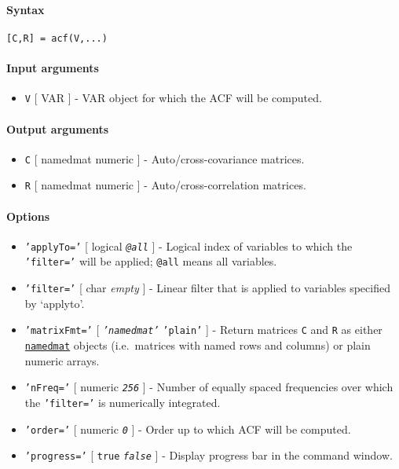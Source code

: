 


	\paragraph{Syntax}

\begin{verbatim}
[C,R] = acf(V,...)
\end{verbatim}

\paragraph{Input arguments}

\begin{itemize}
\itemsep1pt\parskip0pt
\item
  \texttt{V} {[} VAR {]} - VAR object for which the ACF will be
  computed.
\end{itemize}

\paragraph{Output arguments}

\begin{itemize}
\item
  \texttt{C} {[} namedmat \textbar{} numeric {]} - Auto/cross-covariance
  matrices.
\item
  \texttt{R} {[} namedmat \textbar{} numeric {]} -
  Auto/cross-correlation matrices.
\end{itemize}

\paragraph{Options}

\begin{itemize}
\item
  \texttt{'applyTo='} {[} logical \textbar{} \emph{\texttt{@all}} {]} -
  Logical index of variables to which the \texttt{'filter='} will be
  applied; \texttt{@all} means all variables.
\item
  \texttt{'filter='} {[} char \textbar{} \emph{empty} {]} - Linear
  filter that is applied to variables specified by `applyto'.
\item
  \texttt{'matrixFmt='} {[} \emph{\texttt{'namedmat'}} \textbar{}
  \texttt{'plain'} {]} - Return matrices \texttt{C} and \texttt{R} as
  either \href{namedmat/Contents}{\texttt{namedmat}} objects
  (i.e.~matrices with named rows and columns) or plain numeric arrays.
\item
  \texttt{'nFreq='} {[} numeric \textbar{} \emph{\texttt{256}} {]} -
  Number of equally spaced frequencies over which the \texttt{'filter='}
  is numerically integrated.
\item
  \texttt{'order='} {[} numeric \textbar{} \emph{\texttt{0}} {]} - Order
  up to which ACF will be computed.
\item
  \texttt{'progress='} {[} \texttt{true} \textbar{}
  \emph{\texttt{false}} {]} - Display progress bar in the command
  window.
\end{itemize}


